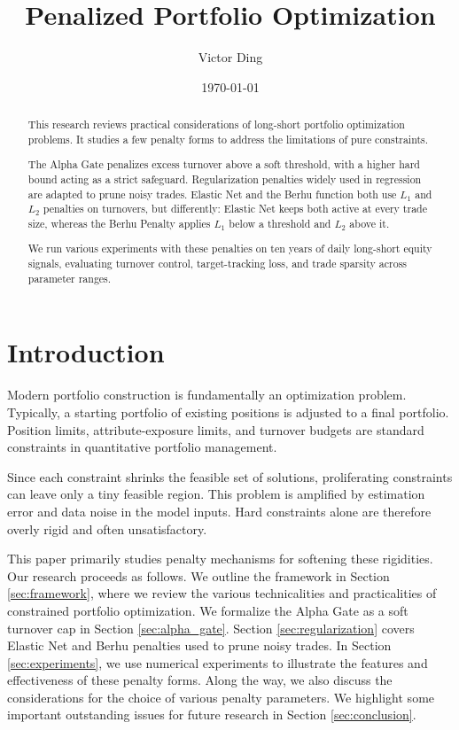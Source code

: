 \documentclass[11pt, letterpaper]{article}
\title{Penalized Portfolio Optimization}
\author{Victor Ding}
\affil{New Canaan High School}
\date{\today}
\begin{document}
\maketitle
\thispagestyle{empty}
\newpage

\begin{abstract}
  \thispagestyle{empty}
  \noindent
This research reviews practical considerations of long-short portfolio optimization problems. It studies a few penalty forms to
address the limitations of pure constraints.

The Alpha Gate penalizes excess turnover above a soft threshold, with a higher hard bound acting as a strict
safeguard. Regularization penalties widely used in regression are adapted to prune noisy trades. Elastic Net and the Berhu
function both use \(L_1\) and \(L_2\) penalties on turnovers, but differently: Elastic Net keeps both active at every trade
size, whereas the Berhu Penalty applies \(L_1\) below a threshold and \(L_2\) above it.

We run various experiments with these penalties on ten years of daily long-short equity signals, evaluating turnover control,
target-tracking loss, and trade sparsity across parameter ranges.
\end{abstract}

\newpage
\pagestyle{myright}
\setcounter{page}{1}

\section{Introduction}
Modern portfolio construction is fundamentally an optimization problem. Typically, a starting portfolio of existing positions is
adjusted to a final portfolio. Position limits, attribute-exposure limits, and turnover budgets are standard constraints in
quantitative portfolio management.

Since each constraint shrinks the feasible set of solutions, proliferating constraints can leave only a tiny feasible
region. This problem is amplified by estimation error and data noise in the model inputs. Hard constraints alone are therefore
overly rigid and often unsatisfactory.

This paper primarily studies penalty mechanisms for softening these rigidities. Our research proceeds as follows. We outline the
framework in Section \ref{sec:framework}, where we review the various technicalities and practicalities of
constrained portfolio optimization. We formalize the Alpha Gate as a soft turnover cap in Section \ref{sec:alpha_gate}.  Section
\ref{sec:regularization} covers Elastic Net and Berhu penalties used to prune noisy trades. In Section \ref{sec:experiments},
we use numerical experiments to illustrate the features and effectiveness of these penalty forms. Along the way, we
also discuss the considerations for the choice of various penalty parameters. We highlight some important outstanding issues for
future research in Section \ref{sec:conclusion}.
\end{document}
